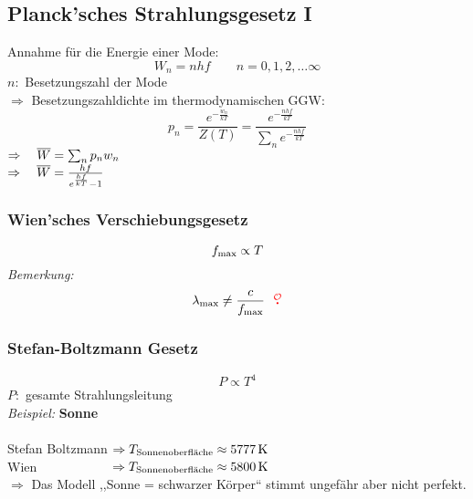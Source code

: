 \subsection{Planck'sches Strahlungsgesetz I}

Annahme für die Energie einer Mode:
\begin{equation*}
W_n = n h f \qquad n = 0,1,2, \dots \infty
\end{equation*}
$ n : $ Besetzungszahl der Mode\\[5pt]
$ \Rightarrow $ Besetzungszahldichte im thermodynamischen GGW:
\begin{equation*}
p_n = \frac{e^{-\frac{w_n}{kT}}}{Z(T)} = \frac{e^{-\frac{n h f}{k T}}}{\sum_n e^{-\frac{nhf}{kT}}}
\end{equation*}
$ \Rightarrow \quad \overline{W} = \sum_n p_n w_n $\\[5pt]
$ \Rightarrow \quad \overline{W} = \frac{hf}{e^{\frac{hf}{kT}} - 1} $
\noindent
{}

\subsubsection{Wien'sches Verschiebungsgesetz}

$$ f_{\textrm{max}} \propto T $$
\emph{Bemerkung:}
\begin{equation*}
\lambda_{\tx{max}} \neq \frac{c}{f_{\tx{max}}} \ \ \color{red} \tx{\mau} \color{black}
\end{equation*}

\subsubsection{Stefan-Boltzmann Gesetz}

$$ P \propto T^4 $$
$ P : $ gesamte Strahlungsleitung\\[10pt]
\emph{Beispiel:} \textbf{Sonne}\\[5pt]
\\
Stefan Boltzmann $ \Rightarrow T_{\textrm{Sonnenoberfläche}} \approx 5777 \, \textrm{K} $\\
Wien $ \quad \ \: \qquad \qquad \Rightarrow T_{\textrm{Sonnenoberfläche}} \approx 5800 \, \textrm{K} $\\
$ \Rightarrow $ Das Modell ,,Sonne = schwarzer Körper`` stimmt ungefähr aber nicht perfekt.

